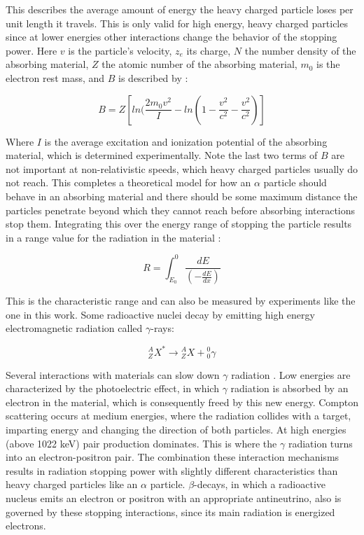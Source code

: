This describes the average amount of energy the heavy charged particle loses per unit length it travels. This is only valid for high energy, heavy charged particles since at lower energies other interactions change the behavior of the stopping power. Here $v$ is the particle’s velocity, $z_e$ its charge, $N$ the number density of the absorbing material, $Z$ the atomic number of the absorbing material, $m_0$ is the electron rest mass, and $B$ is described by \cite{knoll}:

\begin{equation}
B = Z [ ln(\frac{2m_{0}v^{2}}{I} - ln(1 - \frac{v^2}{c^2} - \frac{v^2}{c^2}) ]
\end{equation}

Where $I$ is the average excitation and ionization potential of the absorbing material, which is determined experimentally. Note the last two terms of $B$ are not important at non-relativistic speeds, which heavy charged particles usually do not reach. This completes a theoretical model for how an $\alpha$ particle should behave in an absorbing material and there should be some maximum distance the particles penetrate beyond which they cannot reach before absorbing interactions stop them. Integrating this over the energy range of stopping the particle results in a range value for the radiation in the material \cite{knoll}:

\begin{equation}
R = \int_{E_{0}}^{0} \frac{dE}{(-\frac{dE}{dx})}
\end{equation}

This is the characteristic range and can also be measured by experiments like the one in this work. Some radioactive nuclei decay by emitting high energy electromagnetic radiation called $\gamma$-rays:

\begin{equation}
{}^{A}_{Z}X^{*} \rightarrow {}^{A}_{Z}X + {}^{0}_{0}\gamma
\end{equation}

Several interactions with materials can slow down $\gamma$ radiation \cite{krane}. Low energies are characterized by the photoelectric effect, in which $\gamma$ radiation is absorbed by an electron in the material, which is consequently freed by this new energy. Compton scattering occurs at medium energies, where the radiation collides with a target, imparting energy and changing the direction of both particles. At high energies (above 1022 keV) pair production dominates. This is where the $\gamma$ radiation turns into an electron-positron pair. The combination these interaction mechanisms results in radiation stopping power with slightly different characteristics than heavy charged particles like an $\alpha$ particle. $\beta$-decays, in which a radioactive nucleus emits an electron or positron with an appropriate antineutrino, also is governed by these stopping interactions, since its main radiation is energized electrons.

